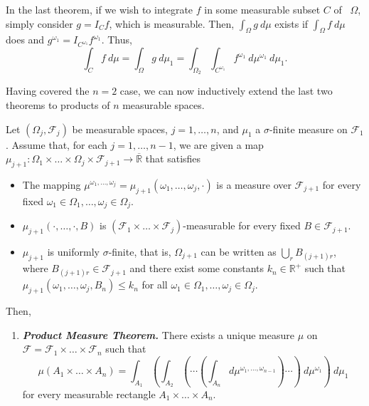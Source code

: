\begin{remk}\label{remark:two-dim Fubini's on subsets}
    In the last theorem, if we wish to integrate \(f\) in some measurable subset \(C\) of ~\(\Omega\), simply consider \(g=I_Cf\), which is measurable. Then, \(\int_{\Omega}g~d\mu\) exists if \(\int_{\Omega}f~d\mu\) does and \(g^{\omega_1}=I_{C^{\omega_1}}f^{\omega_1}\). Thus,
    \[
        \int_{C}f~d\mu=\int_{\Omega}g~d\mu_1=\int_{\Omega_2}\int_{C^{\omega_1}}f^{\omega_1}~d\mu^{\omega_1}~d\mu_1
    .\]
\end{remk}
Having covered the \(n=2\) case, we can now inductively extend the last two theorems to products of \(n\) measurable spaces.

\begin{thrm}
    Let \(\left(\Omega_j,\mathcal{F}_j\right)\) be measurable spaces, \(j=1,\dots,n\), and \(\mu_1\) a \(\sigma\)-finite measure on \(\mathcal{F}_1\). Assume that, for each \(j=1,\dots,n-1\), we are given a map \(\mu_{j+1}\colon\Omega_1\times\dots\times\Omega_j\times\mathcal{F}_{j+1}\to\overline{\mathbb{R}}\) that satisfies
\begin{itemize}
    \item The mapping \(\mu^{\omega_1,\dots,\omega_j}=\mu_{j+1}(\omega_1,\dots,\omega_j,\cdot)\) is a measure over \(\mathcal{F}_{j+1}\) for every fixed \(\omega_1\in\Omega_1,\dots,\omega_j\in\Omega_j\).
    \item \(\mu_{j+1}(\cdot,\dots,\cdot,B)\) is \( \left(\mathcal{F}_1\times\dots\times\mathcal{F}_j\right)\)-measurable for every fixed \(B\in\mathcal{F}_{j+1}\).
    \item \(\mu_{j+1}\) is uniformly \(\sigma\)-finite, that is, \(\Omega_{j+1}\) can be written as \(\bigcup_{r}B_{(j+1)r}\), where \(B_{(j+1)r}\in\mathcal{F}_{j+1}\) and there exist some constants \(k_n\in\mathbb{R}^{+}\) such that \(\mu_{j+1}(\omega_1,\dots,\omega_j,B_n)\leq k_n\) for all \(\omega_1\in\Omega_1,\dots,\omega_j\in\Omega_j\).
\end{itemize}
Then,

\begin{enumerate}
    \item \emph{\textbf{Product Measure Theorem.}} \label{theorem:Product Measure} There exists a unique measure \(\mu\) on \(\mathcal{F}=\mathcal{F}_1\times\dots\times\mathcal{F}_n\) such that
\[
    \mu(A_1\times\dots\times A_n)=\int_{A_1}\left(\int_{A_2}\left(\dotsm\left(\int_{A_n}d\mu^{\omega_1,\dots,\omega_{n-1}}\right)\dotsm\right)~d\mu^{\omega_1}\right)~d\mu_1
\]
for every measurable rectangle \(A_1\times\dots\times A_n\). 


\end{enumerate}
\end{thrm}
